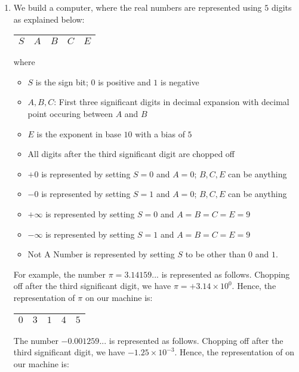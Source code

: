 \documentclass{article}
\begin{document}
\begin{enumerate}
\item We build a computer, where the real numbers are represented using $5$
digits as explained below:

\begin{center}
\renewcommand{\arraystretch}{1.7}
\begin{tabular}{|c|c|c|c|c|}
\hline
$S$ & $A$ & $B$ & $C$ & $E$ \\
\hline
\end{tabular}
\end{center}

where
\begin{itemize}  
\item $S$ is the sign bit; $0$ is positive and $1$ is negative
\item $A,B,C$: First three significant digits in decimal expansion with
decimal point occuring between $A$ and $B$
\item $E$ is the exponent in base $10$ with a bias of $5$
\item All digits after the third significant digit are chopped off
\item $+0$ is represented by setting $S = 0$ and $A = 0$; $B, C, E$ can be anything
\item $-0$ is represented by setting $S = 1$ and $A = 0$; $B, C, E$ can be anything
\item $+\infty$ is represented by setting $S = 0$ and $A = B = C = E = 9$
\item $-\infty$ is represented by setting $S = 1$ and $A = B = C = E = 9$
\item Not A Number is represented by setting $S$ to be other than $0$ and $1$.
\end{itemize}

For example, the number $\pi = 3.14159...$ is represented as follows. Chopping off after the
third significant digit, we have $\pi = +3.14 \times 10^{0}$. Hence, the representation of
$\pi$ on our machine is:

\begin{center}
\renewcommand{\arraystretch}{1.7}
\begin{tabular}{|c|c|c|c|c|}
\hline
$0$ & $3$ & $1$ & $4$ & $5$ \\
\hline
\end{tabular}
\end{center}

The number $-0.001259...$ is represented as follows. Chopping off after the third
significant digit, we have $-1.25 \times 10^{-3}$. Hence, the representation of on our
machine is:


\end{enumerate}
\end{document}
